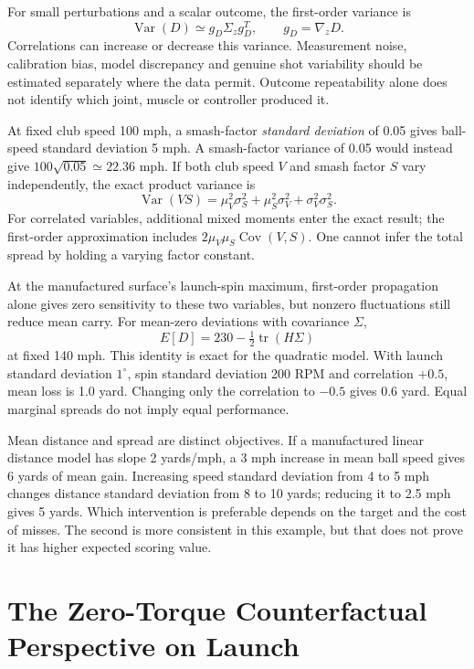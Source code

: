 For small perturbations and a scalar outcome, the first-order variance is
\[
\operatorname{Var}(D)\simeq g_D\Sigma_zg_D^T,
\qquad g_D=\nabla_zD.
\]
Correlations can increase or decrease this variance. Measurement noise,
calibration bias, model discrepancy and genuine shot variability should be
estimated separately where the data permit. Outcome repeatability alone
does not identify which joint, muscle or controller produced it.

At fixed club speed 100 mph, a smash-factor \emph{standard deviation} of
0.05 gives ball-speed standard deviation 5 mph. A smash-factor variance of
0.05 would instead give $100\sqrt{0.05}\simeq22.36$ mph. If both club speed
$V$ and smash factor $S$ vary independently, the exact product variance is
\[
\operatorname{Var}(VS)=\mu_V^2\sigma_S^2+
\mu_S^2\sigma_V^2+\sigma_V^2\sigma_S^2.
\]
For correlated variables, additional mixed moments enter the exact result;
the first-order approximation includes $2\mu_V\mu_S\operatorname{Cov}(V,S)$.
One cannot infer the total spread by holding a varying factor constant.

At the manufactured surface's launch-spin maximum, first-order propagation
alone gives zero sensitivity to these two variables, but nonzero fluctuations
still reduce mean carry. For mean-zero deviations with covariance $\Sigma$,
\[
E[D]=230-\tfrac12\operatorname{tr}(H\Sigma)
\]
at fixed 140 mph. This identity is exact for the quadratic model. With
launch standard deviation $1^\circ$, spin standard deviation 200 RPM and
correlation $+0.5$, mean loss is 1.0 yard. Changing only the correlation to
$-0.5$ gives 0.6 yard. Equal marginal spreads do not imply equal performance.

Mean distance and spread are distinct objectives. If a manufactured linear
distance model has slope 2 yards/mph, a 3 mph increase in mean ball speed
gives 6 yards of mean gain. Increasing speed standard deviation from 4 to
5 mph changes distance standard deviation from 8 to 10 yards; reducing it
to 2.5 mph gives 5 yards. Which intervention is preferable depends on the
target and the cost of misses. The second is more consistent in this example,
but that does not prove it has higher expected scoring value.

\section[The Zero-Torque Counterfactual Perspective on Launch]{The Zero-Torque Counterfactual\\Perspective on Launch}
\label{sec:ztcf_launch}

